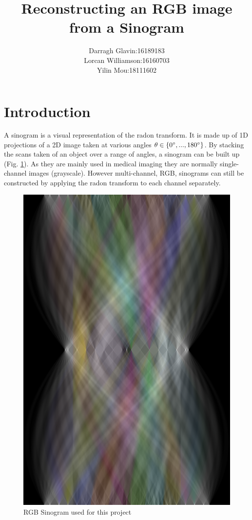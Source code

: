 \documentclass[12pt, a4paper]{article}
\begin{document}
\title{Reconstructing an RGB image from a Sinogram}
\author{\begin{tabular}{ll}
Darragh Glavin:& 16189183\\ Lorcan Williamson:& 16160703\\Yilin Mou:& 18111602
\end{tabular}}
\date{}
\maketitle


\section*{Introduction}
	A sinogram is a visual representation of the radon transform. It is made up of 1D projections of a 2D image taken at various angles $\theta \in \{0\degree, ..., 180\degree\}$. By stacking the scans taken of an object over a range of angles, a sinogram can be built up (Fig. \ref{fig:sinogram}). As they are mainly used in medical imaging they are normally single-channel images (grayscale). However multi-channel, RGB, sinograms can still be constructed by applying the radon transform to each channel separately.
	
	\begin{figure}[h]
		\centering
		\includegraphics[height=0.4\textheight]{../sinogram.png}
		\caption{RGB Sinogram used for this project}
		\label{fig:sinogram}
	\end{figure}
	
\end{document}
